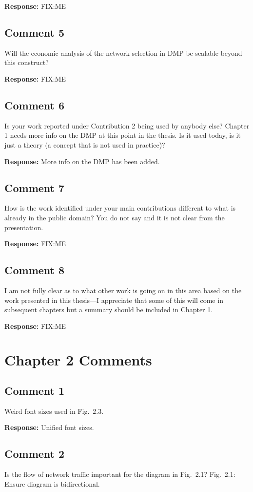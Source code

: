 \documentclass[10pt,a4paper,notitlepage]{article}
\numberwithin{equation}{section}
\begin{document}
\textbf{Response:}
FIX:ME

\subsection{Comment 5}
Will the economic analysis of the network selection in DMP be scalable beyond this construct?

\textbf{Response:}
FIX:ME

\subsection{Comment 6}
Is your work reported under Contribution 2 being used by anybody else? Chapter 1 needs more info on the DMP at this point in the thesis. Is it used today, is it just a theory (a concept that is not used in practice)?

\textbf{Response:}
More info on the DMP has been added.

\subsection{Comment 7}
How is the work identified under your main contributions different to what is already in the public domain? You do not say and it is not clear from the presentation.

\textbf{Response:}
FIX:ME

\subsection{Comment 8}
I am not fully clear as to what other work is going on in this area based on the work presented in this thesis---I appreciate that some of this will come in subsequent chapters but a summary should be included in Chapter 1.

\textbf{Response:}
FIX:ME

\clearpage

\section{Chapter 2 Comments}
\subsection{Comment 1}
Weird font sizes used in Fig.~2.3.

\textbf{Response:}
Unified font sizes.

\subsection{Comment 2}
Is the flow of network traffic important for the diagram in Fig.~2.1? Fig.~2.1: Ensure diagram is bidirectional.
\end{document}

